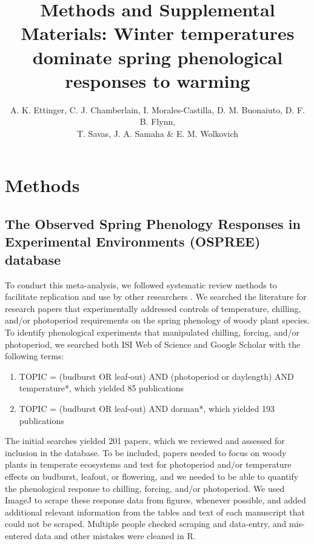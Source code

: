 \documentclass{article}
\begin{document}

\title{Methods and Supplemental Materials:  Winter temperatures dominate spring phenological responses to warming} 

\author{A. K. Ettinger, C. J. Chamberlain, I. Morales-Castilla, D. M. Buonaiuto, D. F. B. Flynn, \\ T. Savas, J. A. Samaha \& E. M. Wolkovich}
\date{} 
\maketitle  %
\renewcommand{\thetable}{S\arabic{table}}
\renewcommand{\thefigure}{S\arabic{figure}}
\section*{Methods}
\subsection*{The Observed Spring Phenology Responses in Experimental Environments (OSPREE) database}
\par To conduct this meta-analysis, we followed systematic review methods to facilitate replication and use by other researchers \citep[e.g., we include at least 22/27 items on the PRISMA checklist, as summarized in Appendix 1,][]{moher2009}. We searched the literature for research papers that experimentally addressed controls of temperature, chilling, and/or photoperiod requirements on the spring phenology of woody plant species. To identify phenological experiments that manipulated chilling, forcing, and/or photoperiod, we searched both ISI Web of Science and Google Scholar with the following terms: 
\begin{enumerate}
\item TOPIC = (budburst OR leaf-out) AND (photoperiod or daylength) AND temperature*, which yielded 85 publications

\item TOPIC = (budburst OR leaf-out) AND dorman*, which yielded 193 publications
\end{enumerate}



The initial searches yielded 201 papers, which we reviewed and assessed for inclusion in the database. To be included, papers needed to focus on woody plants in temperate ecosystems and test for photoperiod and/or temperature effects on budburst, leafout, or flowering, and we needed to be able to quantify the phenological response to chilling, forcing, and/or photoperiod. We used ImageJ to scrape these response data from figures, whenever possible, and added additional relevant information from the tables and text of each manuscript that could not be scraped. Multiple people checked scraping and data-entry, and mis-entered data and other mistakes were cleaned in R.
\end{document}

